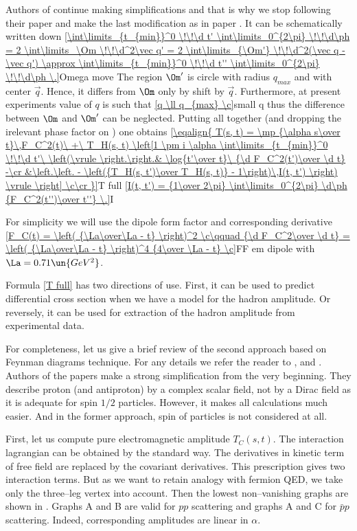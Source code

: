 Authors of  continue making simplifications and that is why we stop following their paper and make the last modification as in paper . It can be schematically written down
\eqref{\int\limits_{t_{min}}^0 \!\!\d t' \int\limits_0^{2\pi} \!\!\d\ph = 2 \int\limits_\Om \!\!\d^2\vec q' = 2 \int\limits_{\Om'} \!\!\d^2(\vec q - \vec q') \approx \int\limits_{t_{min}}^0 \!\!\d t'' \int\limits_0^{2\pi} \!\!\d\ph \.}{Omega move}
The region $\Om'$ is circle with radius $q_{max}$ and with center $\vec q$. Hence, it differs from $\Om$ only by shift by $\vec q$. Furthermore, at present experiments value of $q$ is such that
\eqref{q \ll q_{max} \c}{small q}
thus the difference between $\Om$ and $\Om'$ can be neglected. Putting all together (and dropping the irelevant phase factor on \lhs{}) one obtains
\eqref{\eqalign{
T(s, t) = \mp {\alpha s\over t}\,F_C^2(t)\ +\ T_H(s, t) \left[1 \pm i \alpha \int\limits_{t_{min}}^0 \!\!\d t'\ \left(\vrule width0pt height15pt \right.\right.& \log{t'\over t}\ {\d F_C^2(t')\over \d t} -\cr
&\left.\left. - \left({T_H(s, t')\over T_H(s, t)}  - 1\right)\,I(t, t') \right) \vrule width0pt height30pt \right] \c\cr
}}{T full}
\eqref{I(t, t') = {1\over 2\pi} \int\limits_0^{2\pi} \d\ph {F_C^2(t'')\over t''} \.}{I}

For simplicity we will use the dipole form factor and corresponding derivative
\eqref{F_C(t) = \left( {\La\over\La - t} \right)^2 \c\qquad {\d F_C^2\over \d t} = \left( {\La\over\La - t} \right)^4 {4\over \La - t} \c}{FF em dipole}
with $\La = 0.71\un{GeV^2}$.

Formula \ref{T full} has two directions of use. First, it can be used to predict differential cross section when we have a model for the hadron amplitude. Or reversely, it can be used for extraction of the hadron amplitude from experimental data.

For completeness, let us give a brief review of the second approach based on Feynman diagrams technique. For any details we refer the reader to \rfs{} ,  and . Authors of the papers make a strong simplification from the very beginning. They describe proton (and antiproton) by a complex scalar field, not by a Dirac field as it is adequate for spin $1/2$ particles. However, it makes all calculations much easier. And in the former approach, spin of particles is not considered at all.

First, let us compute pure electromagnetic amplitude $T_C(s, t)$. The interaction lagrangian can be obtained by the standard way. The derivatives in kinetic term of free field are replaced by the covariant derivatives. This prescription gives two interaction terms. But as we want to retain analogy with fermion QED, we take only the three--leg vertex into account. Then the lowest non--vanishing graphs are shown in \fg{} . Graphs A and B are valid for $pp$ scattering and graphs A and C for $\bar pp$ scattering. Indeed, corresponding amplitudes are linear in $\alpha$.

